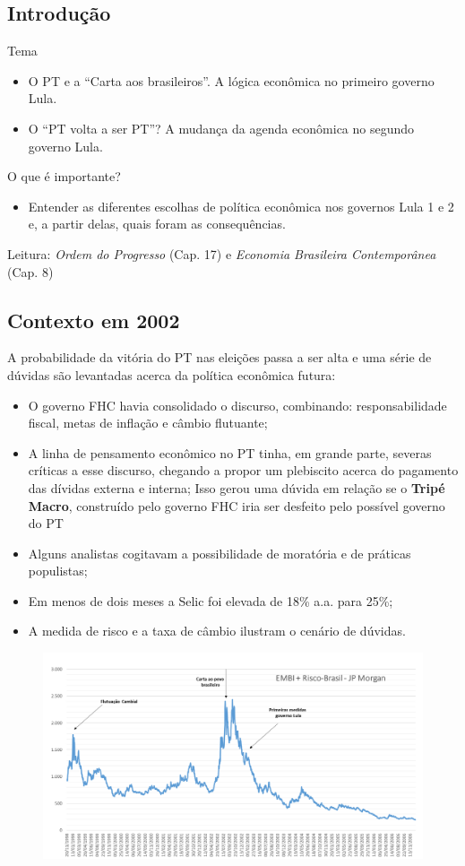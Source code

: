 \documentclass[a4paper,12pt]{article}[abntex2]
\begin{document}
\subsection{\textbf{Introdução}}
Tema
\begin{itemize}
    \item O PT e a ``Carta aos brasileiros''. A lógica econômica no primeiro governo Lula.
    \item O ``PT volta a ser PT''? A mudança da agenda econômica no segundo governo Lula.
\end{itemize}

O que é importante?
\begin{itemize}
    \item Entender as diferentes escolhas de política econômica nos governos Lula 1 e 2 e, a partir delas, quais foram as consequências.
\end{itemize}

Leitura: \textit{Ordem do Progresso} (Cap. 17) e \textit{Economia Brasileira Contemporânea} (Cap. 8)

\subsection{\textbf{Contexto em 2002}}
A probabilidade da vitória do PT nas eleições passa a ser alta e uma série de dúvidas são levantadas acerca da política econômica futura:

\begin{itemize}
    \item O governo FHC havia consolidado o discurso, combinando: responsabilidade fiscal, metas de inflação e câmbio flutuante;
    \item A linha de pensamento econômico no PT tinha, em grande parte, severas críticas a esse discurso, chegando a propor um plebiscito acerca do pagamento das dívidas externa e interna; Isso gerou uma dúvida em relação se o \textbf{Tripé Macro}, construído pelo governo FHC iria ser desfeito pelo possível governo do PT
    \item Alguns analistas cogitavam a possibilidade de moratória e de práticas populistas;
    \item Em menos de dois meses a Selic foi elevada de 18\% a.a. para 25\%;
    \item A medida de risco e a taxa de câmbio ilustram o cenário de dúvidas.
\end{itemize}

\begin{figure}[H]
    \centering
    \includegraphics[width=0.7\linewidth]{Imagens/a16i1.png}
\end{figure}
\end{document}
